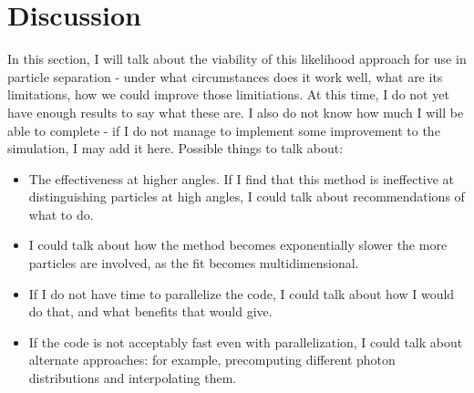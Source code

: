 
\chapter{Discussion}
\label{ch:Discussion}
In this section, I will talk about the viability of this likelihood approach for use in particle separation - under what circumstances does it work well, what are its limitations, how we could improve those limitiations. At this time, I do not yet have enough results to say what these are. I also do not know how much I will be able to complete - if I do not manage to implement some improvement to the simulation, I may add it here. Possible things to talk about:
\begin{itemize}
\item The effectiveness at higher angles. If I find that this method is ineffective at distinguishing particles at high angles, I could talk about recommendations of what to do.
\item I could talk about how the method becomes exponentially slower the more particles are involved, as the fit becomes multidimensional.
\item If I do not have time to parallelize the code, I could talk about how I would do that, and what benefits that would give.
\item If the code is not acceptably fast even with parallelization, I could talk about alternate approaches: for example, precomputing different photon distributions and interpolating them.
\end{itemize}
\endinput

Any text after an \endinput is ignored.
You could put scraps here or things in progress.
